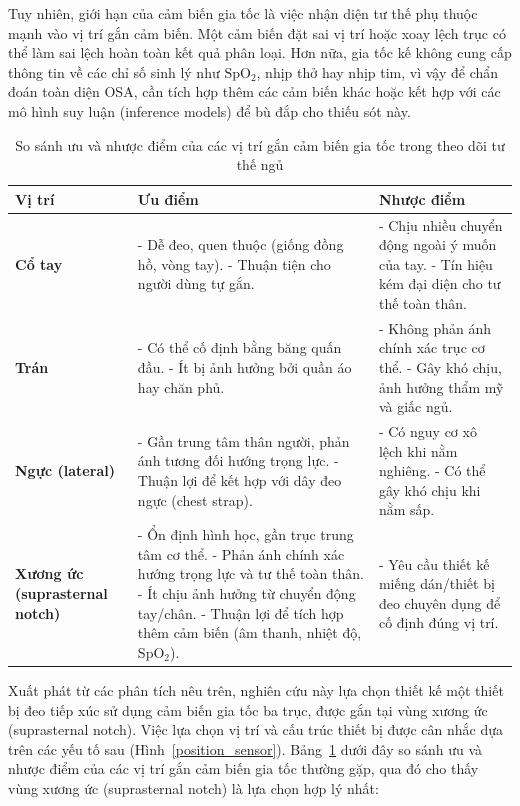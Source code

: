 Tuy nhiên, giới hạn của cảm biến gia tốc là việc nhận diện tư thế phụ 
thuộc mạnh vào vị trí gắn cảm biến. Một cảm biến đặt sai vị trí hoặc 
xoay lệch trục có thể làm sai lệch hoàn toàn kết quả phân loại. 
Hơn nữa, gia tốc kế không cung cấp thông tin về các chỉ số sinh lý 
như $\mathrm{SpO_2}$, nhịp thở hay nhịp tim, vì vậy để chẩn đoán toàn diện OSA, 
cần tích hợp thêm các cảm biến khác hoặc kết hợp với các mô hình 
suy luận (inference models) để bù đắp cho thiếu sót này.
\begin{table}[htbp]
\centering
\caption{So sánh ưu và nhược điểm của các vị trí gắn cảm biến gia tốc trong theo dõi tư thế ngủ}
\label{tab:sensor_position}
\small
\renewcommand{\arraystretch}{1.3}
\begin{tabular}{|p{3cm}|p{5.2cm}|p{6.2cm}|}
\hline
\textbf{Vị trí} & \textbf{Ưu điểm} & \textbf{Nhược điểm} \\
\hline
\textbf{Cổ tay} & 
- Dễ đeo, quen thuộc (giống đồng hồ, vòng tay).  
- Thuận tiện cho người dùng tự gắn. &
- Chịu nhiều chuyển động ngoài ý muốn của tay.  
- Tín hiệu kém đại diện cho tư thế toàn thân. \\
\hline
\textbf{Trán} &
- Có thể cố định bằng băng quấn đầu.  
- Ít bị ảnh hưởng bởi quần áo hay chăn phủ. &
- Không phản ánh chính xác trục cơ thể.  
- Gây khó chịu, ảnh hưởng thẩm mỹ và giấc ngủ. \\
\hline
\textbf{Ngực (lateral)} &
- Gần trung tâm thân người, phản ánh tương đối hướng trọng lực.  
- Thuận lợi để kết hợp với dây đeo ngực (chest strap). &
- Có nguy cơ xô lệch khi nằm nghiêng.  
- Có thể gây khó chịu khi nằm sấp. \\
\hline
\textbf{Xương ức (suprasternal notch)} &
- Ổn định hình học, gần trục trung tâm cơ thể.  
- Phản ánh chính xác hướng trọng lực và tư thế toàn thân.  
- Ít chịu ảnh hưởng từ chuyển động tay/chân.  
- Thuận lợi để tích hợp thêm cảm biến (âm thanh, nhiệt độ, SpO$_2$). &
- Yêu cầu thiết kế miếng dán/thiết bị đeo chuyên dụng để cố định đúng vị trí. \\
\hline
\end{tabular}
\end{table}

Xuất phát từ các phân tích nêu trên, nghiên cứu này lựa chọn thiết 
kế một thiết bị đeo tiếp xúc sử dụng cảm biến gia tốc ba trục, 
được gắn tại vùng xương ức (suprasternal notch). 
Việc lựa chọn vị trí và cấu trúc thiết bị được cân nhắc dựa 
trên các yếu tố sau (Hình~\ref{position_sensor}). 
Bảng~\ref{tab:sensor_position} dưới đây so sánh ưu 
và nhược điểm của các vị trí gắn cảm biến gia tốc thường gặp, 
qua đó cho thấy vùng xương ức (suprasternal notch) 
là lựa chọn hợp lý nhất:

